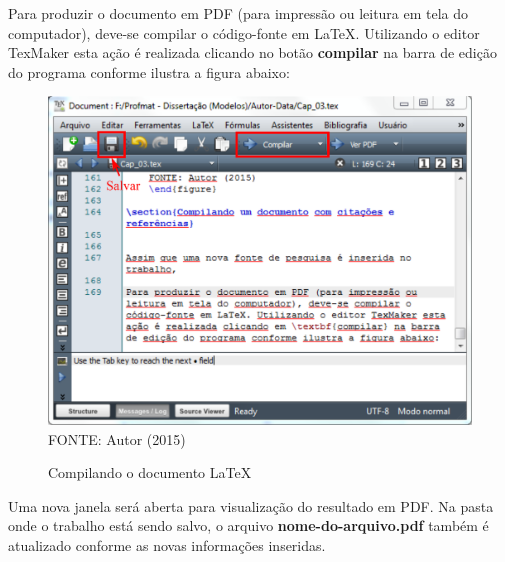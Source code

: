 Para produzir o documento em PDF (para impressão ou leitura em tela do computador), deve-se compilar o código-fonte em LaTeX. Utilizando o editor TexMaker esta ação é realizada clicando no botão \textbf{compilar} na barra de edição do programa conforme ilustra a figura abaixo:
	\begin{figure}[H]
	\centering
	\caption{Compilando o documento LaTeX}
	\includegraphics[scale=0.25]
	{img/fig17.png}\label{fig17}\\
	FONTE: Autor (2015)
	\end{figure}
	Uma nova janela será aberta para visualização do resultado em PDF. Na pasta onde o trabalho está sendo salvo, o arquivo \textbf{nome-do-arquivo.pdf} também é atualizado conforme as novas informações inseridas.
